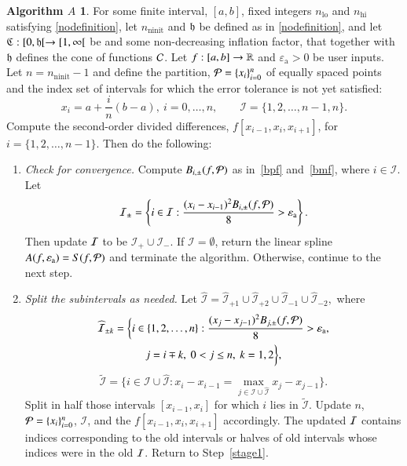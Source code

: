 \documentclass[review]{elsarticle}
\newcommand{\abstol}{\varepsilon_{\textrm{a}}}
\theoremstyle{definition}
\newtheorem*{algoA}{Algorithm $A$}
\DeclareMathOperator{\lo}{lo}
\DeclareMathOperator{\ninit}{ninit}
\begin{document}
\begin{algoA} \label{AlgoA}
For some finite interval, $[a,b]$,  fixed integers $n_{\lo}$ and $n_{\text{hi}}$ satisfying \eqref{nodefinition}, let $n_{\ninit}$ and $\mathfrak{h}$ be defined as in \eqref{nodefinition}, and let  $\mathfrak{C}:[0,\mathfrak{h}[ \to [1, \infty[$ be and some non-decreasing inflation factor, that together with $\mathfrak{h}$ defines the cone of functions $\mathcal{C}$.  Let $f:[a,b] \to \mathbb{R}$ and $\abstol >0$ be
user inputs.  Let  $n=n_{\ninit}-1$ and define the partition, $\mathcal{P} = \{x_i\}_{i=0}^n$ of  equally spaced points and the index set of intervals for which the error tolerance
is not yet satisfied:
$$x_i=a+\frac{i}{n}(b-a), \ i=0,\ldots,n, \qquad
\mathcal{I} = \{1,2,\ldots,n-1,n\}.$$
Compute the second-order divided differences, $f[x_{i-1},
x_{i}, x_{i+1}]$, for $i = \{1,2,\ldots,n-1\}$. Then do the
following:
\begin{enumerate}[\em Step 1.]%
\item \label{stage1} \emph{Check for convergence.}
Compute $B_{i,\pm}(f,\mathcal{P})$ as in~\eqref{bpf} and~\eqref{bmf}, where $i \in \mathcal{I}$.
Let
\[
\mathcal{I}_\pm = \left\{i \in \mathcal{I}: \frac{(x_i - x_{i-1})^2B_{i,\pm}(f,\cp)}{8}  > \abstol \right\}.
\]
Then update $\mathcal{I}$ to be $\mathcal{I}_+ \cup \mathcal{I}_-$.  If $\mathcal{I} = \emptyset$, return the linear spline $A(f,\abstol) = S(f, \cp)$ and terminate the algorithm.
Otherwise, continue to the next step.
\item \label{stage2} \emph{Split the subintervals as needed.}
Let $\widehat{\mathcal{I}}=\widehat{\mathcal{I}}_{+1} \cup \widehat{\mathcal{I}}_{+2} \cup \widehat{\mathcal{I}}_{-1} \cup \widehat{\mathcal{I}}_{-2},$ where
\begin{multline*}
\widehat{\mathcal{I}}_{\pm k} = \biggl\{i \in \{1,2,\ldots,n\}: \frac{(x_j - x_{j-1})^2B_{j,\pm}(f,\cp)}{8}  > \abstol,\\
 j=i\mp k,\ 0<j\le n,\ k=1,2 \biggr\},
\end{multline*}
\[\widetilde{\mathcal{I}}=\biggl\{i \in \mathcal{I} \cup \widehat{\mathcal{I}}: x_i - x_{i-1}=\max\limits_{j \in \mathcal{I} \cup \widehat{\mathcal{I}} } x_j-x_{j-1} \biggr\}.\]
Split in half those intervals $[x_{i-1},x_i]$ for which $i$ lies in $\widetilde{\mathcal{I}}$.
Update $n$, $\mathcal{P} = \{x_i\}_{i=0}^n$, $\mathcal{I}$, and the $f[x_{i-1}, x_{i}, x_{i+1}]$ accordingly.  The updated $\mathcal{I}$ contains  indices corresponding to the old intervals or halves of old intervals whose indices were in the old $\mathcal{I}$.  Return to Step~\ref{stage1}.
\end{enumerate}
\end{algoA}
\end{document}
